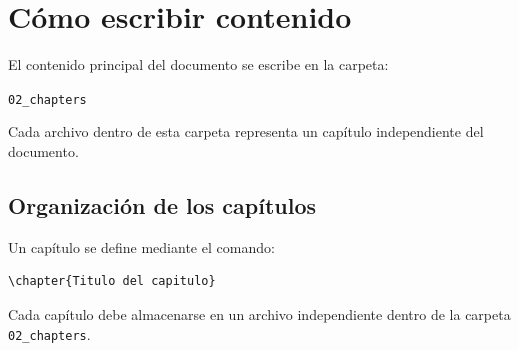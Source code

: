%
%
%
%
%
%
%
%
%
%


\chapter{Cómo escribir contenido}

El contenido principal del documento se escribe en la
carpeta:

\texttt{02\_chapters}

Cada archivo dentro de esta carpeta representa un capítulo
independiente del documento.




\section{Organización de los capítulos}

Un capítulo se define mediante el comando:

\begin{lstlisting}[caption={Creación de un capítulo},label={code:chapter}]
\chapter{Titulo del capitulo}
\end{lstlisting}


Cada capítulo debe almacenarse en un archivo independiente
dentro de la carpeta \texttt{02\_chapters}.




